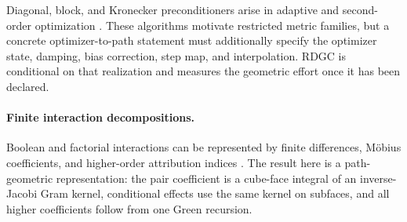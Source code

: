 Diagonal, block, and Kronecker preconditioners arise in adaptive and
second-order optimization
\cite{duchi2011adagrad,kingma2014adam,shazeer2018adafactor,
martens2015kfac,grosse2016kfc,gupta2018shampoo,anil2020scalable}.
These algorithms motivate restricted metric families, but a concrete
optimizer-to-path statement must additionally specify the optimizer state,
damping, bias correction, step map, and interpolation.  RDGC is conditional
on that realization and measures the geometric effort once it has been
declared.

\paragraph{Finite interaction decompositions.}
Boolean and factorial interactions can be represented by finite differences,
M\"obius coefficients, and higher-order attribution indices
\cite{pukelsheim2006optimal,dasgupta2015causal,dhamdhere2020shapley,
janizek2021explaining}.  The result here is a path-geometric representation:
the pair coefficient is a cube-face integral of an inverse-Jacobi Gram kernel,
conditional effects use the same kernel on subfaces, and all higher
coefficients follow from one Green recursion.


